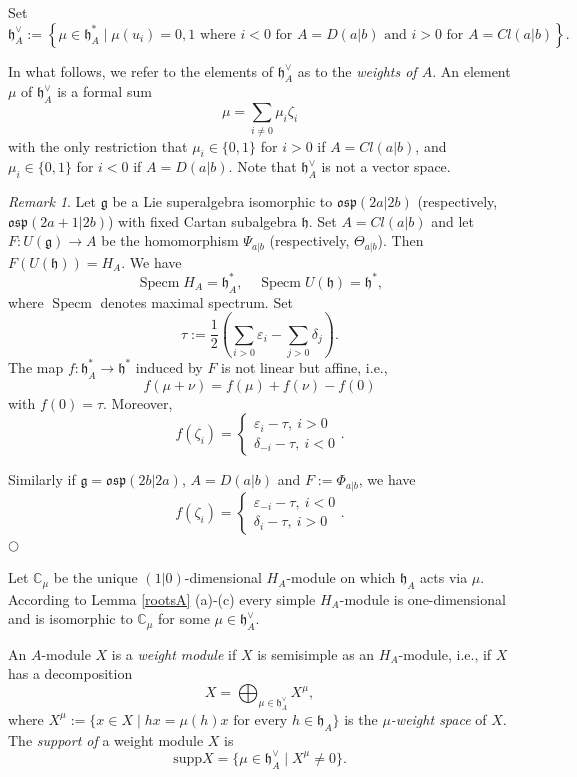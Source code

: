 \documentclass[12pt]{amsart}
\makeatletter
\def\@putname#1#2#3#4{\def\@@ref{#3}\let\old@bf\bf
        \def\bf##1{\old@bf\if?\noexpand##1?{#4}\else##1\fi}%
	#1{#2}%
        \let\bf\old@bf}
\def\@putname#1#2#3#4{\def\@@ref{#3}\let\old@bf\bf	%
	\let\old@reset@font\reset@font			%
        \def\bf##1{\old@bf\if?\noexpand##1?{#4}\else##1\fi}%
	\def\reset@font##1##2{\old@reset@font##1\if?\noexpand##2?{#4}\else##2\fi}#1{#2}%
        \let\bf\old@bf\let\reset@font\old@reset@font}
\let\my@ref=\ref
\def\ref#1{\@putname\my@ref{#1}{#1}{\tiny\rm\@@ref}}
\theoremstyle{plain} %
\numberwithin{equation}{section}
\theoremstyle{definition}
\theoremstyle{remark}
\newtheorem{remark}[definition]{Remark} %
\theoremstyle{plain} %
\renewcommand{\gg}{\mathfrak{g}}
\newcommand{\CC}{\mathbb{C}}
\newcommand{\supp}{\mathrm{supp}}
\newcommand{\gh}{\mathfrak{h}}
\def\gg{\mathfrak{g}}
\def\gh{\mathfrak{h}}
\makeatother
\begin{document}
Set
$$
\gh^{\vee}_A:= \left\{\mu\in\gh_A^*\mid\mu(u_i)=0,1 \mbox{ where } i<0   \mbox{ for  }A=D(a|b)  \mbox{ and } i>0  \mbox{ for }A=Cl(a|b)\right\}.
      $$
      
      
              
In what follows, we refer to the elements of $\gh^{\vee}_A$ as to the \emph{weights of $A$}. An element $\mu$ of $\gh^{\vee}_A$ is a formal sum
$$\mu =  \sum_{i\neq 0}\mu_i \zeta_i $$
 with the only restriction that $\mu_i\in \{0,1 \}$ for  $i>0$ if $A = Cl(a|b)$,  and  $\mu_i\in \{0,1 \}$ for $i<0$ if $A = D(a|b)$.  Note that  $\gh^{\vee}_A$ is not a vector space.


\begin{remark}\label{weightcorrespondence} Let $\gg$ be a Lie superalgebra isomorphic to $\mathfrak{osp}(2a|2b)$ (respectively,
       $\mathfrak{osp}(2a+1|2b)$) with fixed Cartan subalgebra $\gh$. Set $A=Cl(a|b)$ and let $F:U(\gg)\to A$ be the homomorphism $\Psi_{a|b}$ (respectively, $\Theta_{a|b}$).  Then $F(U(\gh))=H_A$. We have
       $$\operatorname{Specm}H_A=\gh^*_A,\quad \operatorname{Specm}U(\gh)=\gh^*, $$
       where $\operatorname{Specm}$ denotes  maximal spectrum. Set
       $$\tau:=\frac{1}{2}(\sum_{i>0}\varepsilon_i-\sum_{j>0}\delta_{j}).$$ The map $f:\gh_A^*\to \gh^*$ induced by $F$ is not linear but affine, i.e.,
$$f(\mu+\nu)=f(\mu)+f(\nu)-f(0)$$
       with $f(0)=\tau$. Moreover,
       $$f(\zeta_i)=\begin{cases} \varepsilon_i-\tau,\ i>0 \\ \delta_{-i}-\tau,\ i<0 \end{cases}.$$


       Similarly if $\gg=\mathfrak{osp}(2b|2a)$, $A=D(a|b)$ and $F:=\Phi_{a|b}$, we have
               $$f(\zeta_i)=\begin{cases} \varepsilon_{-i}-\tau,\ i<0 \\ \delta_{i}-\tau,\ i>0 \end{cases}.$$
       \hfill${\bigcirc}$
     \end{remark}



Let $\CC_\mu$ be the unique $(1|0)$-dimensional $H_A$-module on which $\gh_A$ acts via $\mu$.  According to Lemma \ref{rootsA}(a)-(c) every simple $H_A$-module is one-dimensional and is isomorphic to $\CC_{\mu}$ for some $\mu\in \gh^{\vee}_A$. 
        
                An $A$-module $X$ is a \emph{weight module} if $X$ is semisimple as an $H_A$-module, i.e., if $X$ has a  decomposition
        $$X=\bigoplus_{\mu\in \gh^{\vee}_A} X^\mu,$$
        where $X^{\mu} := \{ x \in X \; | \; hx=\mu(h)x \mbox{ for every }h \in \mathfrak h_A\}$ is the \emph{$\mu$-weight space} of $X$. The \emph{support of} a weight module $X$ is  
        $$ \supp  X = \{\mu \in \gh^{\vee}_A \; | \; X^{\mu} \neq 0 \}. $$
\end{document}
